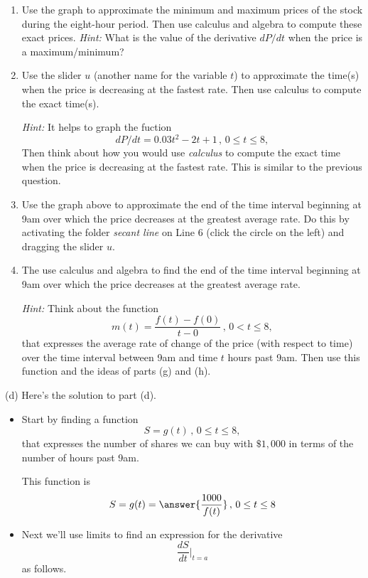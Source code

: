 \documentclass{ximera}
\begin{document}
\begin{question}
\begin{enumerate}
\item Use the graph to approximate the minimum and maximum prices of the stock during the eight-hour period. Then use calculus and algebra to compute these exact prices. \emph{Hint:} What is the value of the derivative $dP/dt$ when the price is a maximum/minimum?


\item Use the slider $u$ (another name for the variable $t$) to approximate the time(s) when the price is decreasing at the fastest rate. Then use calculus to compute the exact time(s). 

\emph{Hint:} It helps to graph the fuction
\[
  dP/dt = 0.03t^2 - 2t + 1 \, , \, 0\leq t \leq 8 ,
\]
Then think about how you would use \emph{calculus} to compute the exact time when the price is decreasing at the fastest rate. This is similar to the previous question. 




\item Use the graph above to approximate the end of the time interval beginning at 9am over which the price decreases at the greatest average rate.  Do this by activating the folder \emph{secant line} on Line 6 (click the circle on the left) and dragging the slider $u$.

\item The use calculus and algebra to find the end of the time interval beginning at 9am over which the price decreases at the greatest average rate.  

\emph{Hint:} Think about the function
\[
     m(t) = \frac{f(t)-f(0)}{t-0} \, , \, 0 < t\leq 8 ,
\]
that expresses the average rate of change of the price (with respect to time) over the time interval between 9am and time $t$ hours past 9am. Then use this function and the ideas of parts (g) and (h).

\end{enumerate}

\begin{explanation}
(d) Here's the solution to part (d).

\begin{itemize}
\item Start by finding a function 
\[
   S = g(t) \, , \, 0\leq t \leq 8 ,
\]
that expresses the number of shares we can buy with $\$1,000$ in terms of the number of hours past 9am. 

This function is
\[
         S = g(t) = \answer{\frac{1000}{f(t)}} \, , \, 0\leq t \leq 8 
\]


\item Next we'll use limits to find an expression for the derivative
\[
    \frac{dS}{dt}\Big|_{t=a} 
\]
as follows.


\end{itemize}
\end{explanation}
\end{question}
\end{document}
